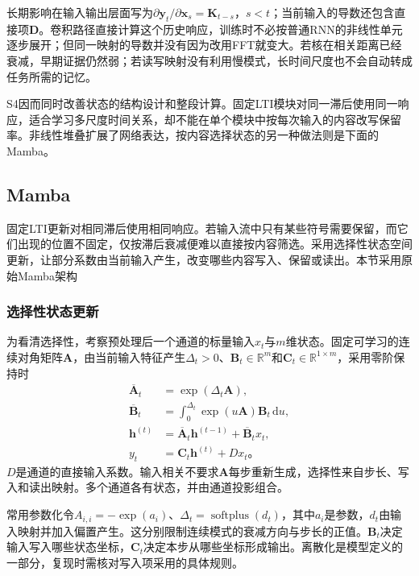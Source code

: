长期影响在输入输出层面写为$\partial\bm y_t/\partial\bm x_s=\bm K_{t-s}$，$s<t$；当前输入的导数还包含直接项$\bm D$。卷积路径直接计算这个历史响应，训练时不必按普通RNN的非线性单元逐步展开；但同一映射的导数并没有因为改用FFT就变大。若核在相关距离已经衰减，早期证据仍然弱；若读写映射没有利用慢模式，长时间尺度也不会自动转成任务所需的记忆。

S4因而同时改善状态的结构设计和整段计算。固定LTI模块对同一滞后使用同一响应，适合学习多尺度时间关系，却不能在单个模块中按每次输入的内容改写保留率。非线性堆叠扩展了网络表达，按内容选择状态的另一种做法则是下面的Mamba。

\subsection{Mamba}
\label{sec:rnn-mamba}

固定LTI更新对相同滞后使用相同响应。若输入流中只有某些符号需要保留，而它们出现的位置不固定，仅按滞后衰减便难以直接按内容筛选。采用选择性状态空间更新，让部分系数由当前输入产生，改变哪些内容写入、保留或读出。本节采用原始Mamba架构

\subsubsection{选择性状态更新}
\label{sec:rnn-mamba-selection}

为看清选择性，考察预处理后一个通道的标量输入$x_t$与$m$维状态。固定可学习的连续对角矩阵$\bm A$，由当前输入特征产生$\Delta_t>0$、$\bm B_t\in\mathbb R^m$和$\bm C_t\in\mathbb R^{1\times m}$，采用零阶保持时
\begin{equation}
  \begin{aligned}
    \overline{\bm A}_t&=\exp(\Delta_t\bm A),\\
    \overline{\bm B}_t&=\int_0^{\Delta_t}\exp(u\bm A)\bm B_t\,\mathrm du,\\
    \bm h^{(t)}&=\overline{\bm A}_t\bm h^{(t-1)}+\overline{\bm B}_t x_t,\\
    y_t&=\bm C_t\bm h^{(t)}+D x_t\text{。}
  \end{aligned}
  \label{eq:rnn-mamba-selection}
\end{equation}
$D$是通道的直接输入系数。输入相关不要求$\bm A$每步重新生成，选择性来自步长、写入和读出映射。多个通道各有状态，并由通道投影组合。

常用参数化令$A_{i,i}=-\exp(a_i)$、$\Delta_t=\operatorname{softplus}(d_t)$，其中$a_i$是参数，$d_t$由输入映射并加入偏置产生。这分别限制连续模式的衰减方向与步长的正值。$\bm B_t$决定输入写入哪些状态坐标，$\bm C_t$决定本步从哪些坐标形成输出。离散化是模型定义的一部分，复现时需核对写入项采用的具体规则。

